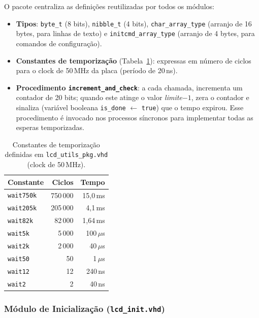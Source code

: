 \documentclass[12pt,a4paper]{article}
\begin{document}
O pacote centraliza as definições reutilizadas por todos os módulos:

\begin{itemize}
    \item \textbf{Tipos}: \texttt{byte\_t} (8 bits), \texttt{nibble\_t} (4 bits),
          \texttt{char\_array\_type} (arranjo de 16 bytes, para linhas de texto) e
          \texttt{initcmd\_array\_type} (arranjo de 4 bytes, para comandos de configuração).
    \item \textbf{Constantes de temporização} (Tabela~\ref{tab:timing}): expressas em
          número de ciclos para o clock de 50\,MHz da placa (período de 20\,ns).
    \item \textbf{Procedimento \texttt{increment\_and\_check}}: a cada chamada, incrementa
          um contador de 20 bits; quando este atinge o valor \textit{limite}$-1$, zera o
          contador e sinaliza (variável booleana \texttt{is\_done} $\leftarrow$ \texttt{true})
          que o tempo expirou. Esse procedimento é invocado nos processos síncronos para
          implementar todas as esperas temporizadas.
\end{itemize}

\begin{table}[H]
\centering
\begin{tabular}{lrr}
\hline
\textbf{Constante} & \textbf{Ciclos} & \textbf{Tempo} \\
\hline
\texttt{wait750k} & 750\,000 & 15{,}0\,ms \\
\texttt{wait205k} & 205\,000 &  4{,}1\,ms \\
\texttt{wait82k}  &  82\,000 &  1{,}64\,ms \\
\texttt{wait5k}   &   5\,000 & 100\,$\mu$s \\
\texttt{wait2k}   &   2\,000 &  40\,$\mu$s \\
\texttt{wait50}   &      50  &   1\,$\mu$s \\
\texttt{wait12}   &      12  & 240\,ns \\
\texttt{wait2}    &       2  &  40\,ns \\
\hline
\end{tabular}
\caption{Constantes de temporização definidas em \texttt{lcd\_utils\_pkg.vhd}
         (clock de 50\,MHz).}
\label{tab:timing}
\end{table}

\subsubsection{Módulo de Inicialização (\texttt{lcd\_init.vhd})}
\end{document}
